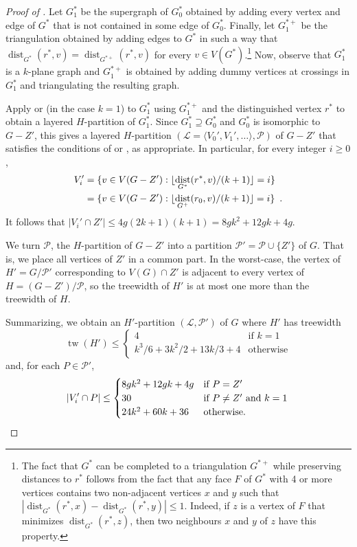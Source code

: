 \documentclass{patmorin}
\DeclareMathOperator{\dist}{dist}
\DeclareMathOperator{\tw}{tw}
\begin{document}
\begin{proof}[Proof of ]
  Let $G^*_1$ be the supergraph of $G^*_0$ obtained by adding every vertex and edge of $G^*$ that is not contained in some edge of $G^*_0$.  Finally, let $G^{*+}_1$ be the triangulation obtained by adding edges to $G^*$ in such a way that $\dist_{G^*}(r^*,v)=\dist_{G^{*+}}(r^*,v)$ for every $v\in V(G^*)$.\footnote{The fact that $G^*$ can be completed to a triangulation $G^{*+}$ while preserving distances to $r^*$ follows from the fact that any face $F$ of $G^*$ with 4 or more vertices contains two non-adjacent vertices $x$ and $y$ such that $|\dist_{G^*}(r^*,x)-\dist_{G^*}(r^*,y)|\le 1$.  Indeed, if $z$ is a vertex of $F$ that minimizes $\dist_{G^*}(r^*,z)$, then two neighbours $x$ and $y$ of $z$ have this property.} Now, observe that $G^*_1$ is a $k$-plane graph and $G^{*+}_1$ is obtained by adding dummy vertices at crossings in $G^*_1$ and triangulating the resulting graph.    
  
  Apply  or (in the case $k=1$)  to $G^*_1$ using $G^{*+}_1$ and the distinguished vertex $r^*$ to obtain a layered $H$-partition of $G^*_1$.  Since $G^*_1\supseteq G^*_0$ and $G^*_0$ is isomorphic to $G-Z'$, this gives a layered $H$-partition $(\mathcal{L}=\langle V_0',V_1',\ldots\rangle,\mathcal{P})$ of $G-Z'$ that satisfies the conditions of  or , as appropriate.  In particular, for every integer $i\ge 0$,
  \begin{align*} 
    V_i'& = \{v\in V(G-Z'):\floor{\dist_{G^*}(r^*,v)/(k+1)} = i\} \\
        & = \{v\in V(G-Z'):\floor{\dist_{G^+}(r_0,v)/(k+1)} = i\} \enspace .
  \end{align*}
  It follows that $|V_i'\cap Z'|\le 4g(2k+1)(k+1) = 8gk^2+12gk+4g$.  
  
  We turn $\mathcal{P}$, the $H$-partition of $G-Z'$ into a partition $\mathcal{P}'=\mathcal{P}\cup \{Z'\}$ of $G$.  That is, we place all vertices of $Z'$ in a common part.  In the worst-case, the vertex of $H'=G/ \mathcal{P}'$ corresponding to $V(G)\cap Z'$ is adjacent to every vertex of $H=(G-Z')/\mathcal{P}$, so the treewidth of $H'$ is at most one more than the treewidth of $H$.
   
  Summarizing, we obtain an $H'$-partition $(\mathcal{L},\mathcal{P}')$ of $G$ where $H'$ has treewidth 
  \[
      \tw(H') 
        \le \begin{cases}
              4 & \text{if $k=1$} \\
              k^3/6 + 3k^2/2 + 13k/3+4 & \text{otherwise}
            \end{cases} 
  \]
  and, for each $P\in\mathcal{P}'$,
  \[ 
    |V_i' \cap P| \le \begin{cases} 8gk^2+12gk+4g & \text{if $P=Z'$} \\
                                    30 & \text{if $P\neq Z'$ and $k=1$} \\
                                    24k^2+60k+36 & \text{otherwise.} 
                      \end{cases} \qedhere
  \]
\end{proof}
\end{document}
